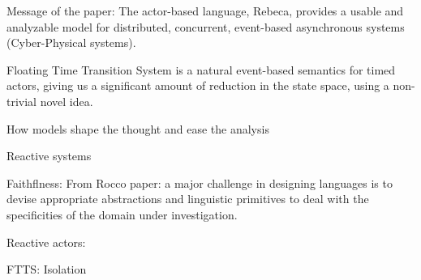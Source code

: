 \documentclass[conference]{IEEEtran}
\begin{document}
	Message of the paper:
	The actor-based language, Rebeca, provides a usable and analyzable model for distributed, concurrent, event-based asynchronous systems (Cyber-Physical systems).
	
	Floating Time Transition System is a natural event-based semantics for timed actors, giving us a significant amount of reduction in the state space, using a non-trivial novel idea.
	
	How models shape the thought and ease the analysis
	
	
	Reactive systems
	
	Faithflness:
	From Rocco paper: a major challenge in designing languages is to devise appropriate abstractions and linguistic primitives to deal with the specificities of the domain under investigation.
	
	Reactive actors: 
	
	FTTS: Isolation
	
\end{document}
